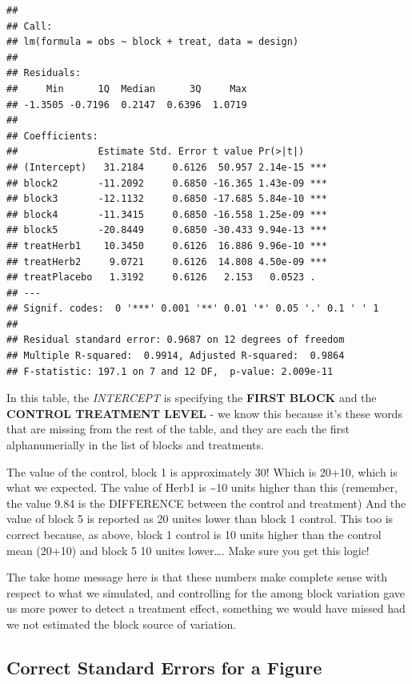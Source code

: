 \documentclass[
]{book}
\begin{document}
\begin{verbatim}
## 
## Call:
## lm(formula = obs ~ block + treat, data = design)
## 
## Residuals:
##     Min      1Q  Median      3Q     Max 
## -1.3505 -0.7196  0.2147  0.6396  1.0719 
## 
## Coefficients:
##              Estimate Std. Error t value Pr(>|t|)    
## (Intercept)   31.2184     0.6126  50.957 2.14e-15 ***
## block2       -11.2092     0.6850 -16.365 1.43e-09 ***
## block3       -12.1132     0.6850 -17.685 5.84e-10 ***
## block4       -11.3415     0.6850 -16.558 1.25e-09 ***
## block5       -20.8449     0.6850 -30.433 9.94e-13 ***
## treatHerb1    10.3450     0.6126  16.886 9.96e-10 ***
## treatHerb2     9.0721     0.6126  14.808 4.50e-09 ***
## treatPlacebo   1.3192     0.6126   2.153   0.0523 .  
## ---
## Signif. codes:  0 '***' 0.001 '**' 0.01 '*' 0.05 '.' 0.1 ' ' 1
## 
## Residual standard error: 0.9687 on 12 degrees of freedom
## Multiple R-squared:  0.9914, Adjusted R-squared:  0.9864 
## F-statistic: 197.1 on 7 and 12 DF,  p-value: 2.009e-11
\end{verbatim}

In this table, the \emph{INTERCEPT} is specifying the \textbf{FIRST BLOCK} and the \textbf{CONTROL TREATMENT LEVEL} - we know this because it's these words that are missing from the rest of the table, and they are each the first alphanumerially in the list of blocks and treatments.

The value of the control, block 1 is approximately 30! Which is 20+10, which is what we expected.
The value of Herb1 is \textasciitilde10 units higher than this (remember, the value 9.84 is the DIFFERENCE between the control and treatment)
And the value of block 5 is reported as 20 unites lower than block 1 control. This too is correct because, as above, block 1 control is 10 units higher than the control mean (20+10) and block 5 10 unites lower\ldots. Make sure you get this logic!

The take home message here is that these numbers make complete sense with respect to what we simulated, and controlling for the among block variation gave us more power to detect a treatment effect, something we would have missed had we not estimated the block source of variation.

\hypertarget{correct-standard-errors-for-a-figure}{%
\subsection{Correct Standard Errors for a Figure}\label{correct-standard-errors-for-a-figure}}
\end{document}
